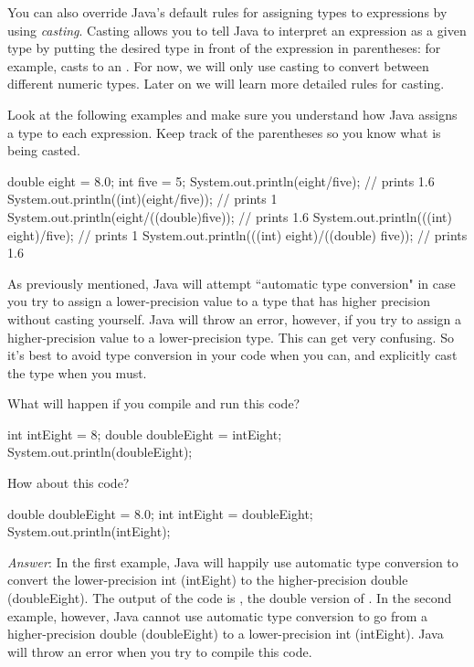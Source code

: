 You can also override Java's default rules for assigning types to expressions by using \emph{casting}. Casting allows you to tell Java to interpret an expression as a given type by putting the desired type in front of the expression in parentheses: for example,  casts  to an . For now, we will only use casting to convert between different numeric types. Later on we will learn more detailed rules for casting.	
\begin{example}	
  Look at the following examples and make sure you understand how Java assigns a type to each expression. Keep track of the parentheses so you know what is being casted.	
  \begin{code}	
    double eight = 8.0;	
    int five = 5;	
    System.out.println(eight/five); // prints 1.6	
    System.out.println((int)(eight/five)); // prints 1	
    System.out.println(eight/((double)five)); // prints 1.6	
    System.out.println(((int) eight)/five); // prints 1	
    System.out.println(((int) eight)/((double) five)); // prints 1.6	
  \end{code}	
\end{example}	

As previously mentioned, Java will attempt ``automatic type conversion" in case you try to assign a lower-precision value to a type that has higher precision without casting yourself. Java will throw an error, however, if you try to assign a higher-precision value to a lower-precision type. This can get very confusing. So it's best to avoid type conversion in your code when you can, and explicitly cast the type when you must. 

\begin{example}
  What will happen if you compile and run this code? 
  \begin{code}
    int intEight = 8;
   double doubleEight = intEight;
   System.out.println(doubleEight);
  \end{code}
  
  How about this code? 
  \begin{code}
  double doubleEight = 8.0;
  int intEight = doubleEight; 
  System.out.println(intEight);
  \end{code}
  
\noindent \emph{Answer}: In the first example, Java will happily use automatic type conversion to convert the lower-precision int (intEight) to the higher-precision double (doubleEight). The output of the code is , the double version of . In the second example, however, Java cannot use automatic type conversion to go from a higher-precision double (doubleEight) to a lower-precision int (intEight). Java will throw an error when you try to compile this code. 
\end{example}

